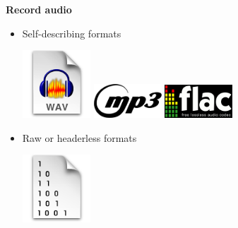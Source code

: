 \documentclass[usenames,dvipsnames, 18pt, compress, aspectratio=169]{beamer}
\begin{document}
\begin{frame}[fragile]{}
    \frametitle{}
    \begin{center}
        \textbf{Record audio}
        \vspace{0.2cm}

        \begin{itemize}[label={\MVRightarrow}]
            \item Self-describing formats\\
                \vspace{0.5cm}
                \hspace{2cm}
                \begin{minipage}[b]{0.6\linewidth}
                    \includegraphics[width=0.2\textwidth]{wav_logo.png}
                    \hfill
                    \includegraphics[width=0.2\textwidth]{mp3_logo.png}
                    \hfill
                    \includegraphics[width=0.2\textwidth]{flac_logo.png}
                \end{minipage}
                \vspace{0.5cm}
            \item Raw or headerless formats\\
                \vspace{0.5cm}
                \hspace{2cm}
                \begin{minipage}[b]{0.6\linewidth}
                    \includegraphics[width=0.2\textwidth]{binary_logo.png}
                \end{minipage}
        \end{itemize}

    \end{center}
\end{frame}
\end{document}
